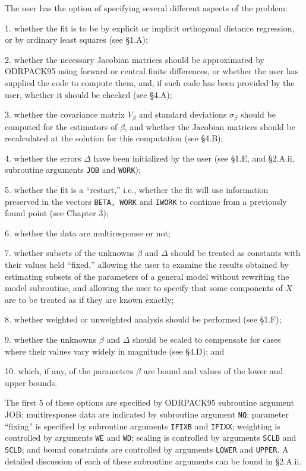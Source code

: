 \bigskip{}
\medskip
\noindent The user has the option of specifying several different aspects of the problem:
\item{1.} whether the fit is to be by explicit or implicit orthogonal distance regression, or by ordinary least squares (see \S 1.A);
\item{2.} whether the necessary Jacobian matrices should be approximated by
ODRPACK95 using forward or central finite differences, or whether the user has supplied the code to compute them, and, if such code has been provided by the user, whether it should be checked (see \S 4.A);
\item{3.} whether the covariance matrix $V_\beta$ and standard deviations $\sigma_\beta$ should be computed for the estimators of $\beta$, and whether the Jacobian matrices should be recalculated at the solution for this computation (see \S 4.B);
\item{4.} whether the errors $\Delta$ have been initialized by the user (see \S 1.E, and \S 2.A.ii, subroutine arguments {\tt JOB} and {\tt WORK});
\item{5.} whether the fit is a ``restart,'' i.e., whether the fit will use information preserved in the vectors {\tt BETA, WORK} and {\tt IWORK} to continue from a previously found point (see Chapter 3);
\item{6.} whether the data are multiresponse or not;
\item{7.} whether subsets of the unknowns $\beta$ and $\Delta$  should be treated as constants with their values held ``fixed,'' allowing the user to examine the results obtained by estimating subsets of the parameters of a general model without rewriting the model subroutine, and allowing the user to specify that some components of $X$ are to be treated as if they are known exactly;
\item{8.} whether weighted or unweighted analysis should be performed (see \S 1.F);
\item{9.} whether the unknowns $\beta$ and $\Delta$  should be scaled to
compensate for cases where their values vary widely in magnitude (see \S 4.D);
and
\item{10.} which, if any, of the parameters $\beta$ are bound and values of the
lower and upper bounds.

\noindent The first 5 of these options are specified by ODRPACK95
subroutine argument JOB; multiresponse data are indicated by subroutine
argument {\tt NQ}; parameter ``fixing'' is specified by subroutine
arguments {\tt IFIXB} and {\tt IFIXX}; weighting is controlled by
arguments {\tt WE} and {\tt WD}; scaling is controlled by arguments
{\tt SCLB} and {\tt SCLD}; and bound constraints are controlled by arguments
{\tt LOWER} and {\tt UPPER}. A detailed discussion of each of these
subroutine arguments can be found in \S 2.A.ii.

